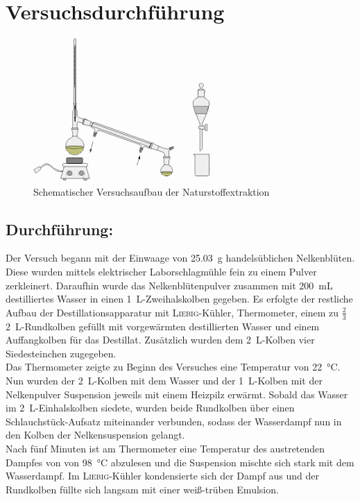 \section{Versuchsdurchführung}
\label{sec:durchfuerung}
\begin{figure}[h!]
	\centering
	\includegraphics[width=0.6\textwidth]{img/versuchsaufbau_1}
	\caption{Schematischer Versuchsaufbau der Naturstoffextraktion}
	\label{fig:versuchsaufbau_1}
\end{figure}
\FloatBarrier

\newpage
\subsection*{Durchführung:}

Der Versuch begann mit der Einwaage von \SI{25,03}{\gram} handelsüblichen Nelkenblüten. Diese wurden mittels elektrischer Laborschlagmühle fein zu einem Pulver zerkleinert.
Daraufhin wurde das Nelkenblütenpulver zusammen mit \SI{200 }{\milli \liter} destilliertes Wasser in einen \SI{1}{\liter}-Zweihalskolben gegeben.
Es erfolgte der restliche Aufbau der Destillationsapparatur mit \textsc{ Liebig}-Kühler, Thermometer, einem zu $\frac{2}{3}$  \SI{2}{\liter}-Rundkolben gefüllt mit vorgewärmten destillierten Wasser und einem Auffangkolben für das Destillat.
Zusätzlich wurden dem \SI{2}{\liter}-Kolben vier Siedesteinchen zugegeben.\\
Das Thermometer zeigte zu Beginn des Versuches eine Temperatur von \SI{22}{\celsius}.\\
Nun wurden der \SI{2}{\liter}-Kolben mit dem Wasser und der \SI{1}{\liter}-Kolben mit der Nelkenpulver Suspension jeweils mit einem Heizpilz erwärmt.
Sobald das Wasser im \SI{2}{\liter}-Einhalskolben siedete, wurden beide Rundkolben über einen Schlauchstück-Aufsatz miteinander verbunden, sodass der Wasserdampf nun in den Kolben der Nelkensuspension gelangt.\\
Nach fünf Minuten ist am Thermometer eine Temperatur des austretenden Dampfes von von \SI{98}{\celsius} abzulesen und die Suspension mischte sich stark mit dem Wasserdampf.
Im \textsc{Liebig}-Kühler kondensierte sich der Dampf aus und der Rundkolben füllte sich langsam mit einer weiß-trüben Emulsion.\\

